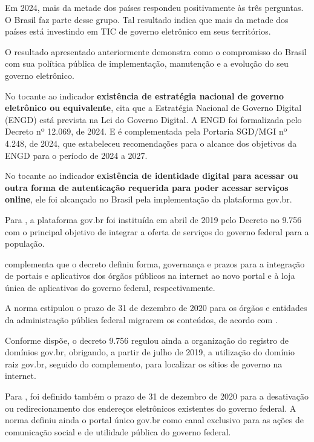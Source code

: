 Em 2024, mais da metade dos países respondeu positivamente às três perguntas. O Brasil faz parte desse grupo. Tal resultado indica que mais da metade dos países está investindo em TIC de governo eletrônico em seus territórios.

O resultado apresentado anteriormente demonstra como o compromisso do Brasil com sua política pública de implementação, manutenção e a evolução do seu governo eletrônico.

No tocante ao indicador \textbf{existência de estratégia nacional de governo
eletrônico ou equivalente}, \cite{brasil_engd} cita que a Estratégia Nacional de Governo Digital (ENGD) está prevista na Lei do Governo Digital. A ENGD foi formalizada pelo Decreto nº 12.069, de 2024. E é complementada pela Portaria SGD/MGI nº 4.248, de 2024, que estabeleceu recomendações para o alcance dos objetivos da ENGD para o período de 2024 a 2027.

No tocante ao indicador \textbf{existência de identidade digital para acessar
ou outra forma de autenticação requerida para poder acessar serviços online}, ele foi alcançado no Brasil pela implementação da plataforma gov.br. 

Para \cite{mitkiewicz2024transformaccao}, a plataforma gov.br foi instituída em abril de 2019 pelo Decreto no 9.756 com o principal objetivo de integrar a oferta de serviços do governo federal para a população. 

\cite{mitkiewicz2024transformaccao} complementa que o decreto definiu forma, governança e prazos para a integração de portais e aplicativos dos órgãos públicos na internet ao novo portal e à loja única de aplicativos do governo federal, respectivamente. 

A norma estipulou o prazo de 31 de dezembro de 2020 para os órgãos e entidades da administração pública federal migrarem os conteúdos, de acordo com \cite{mitkiewicz2024transformaccao}.

Conforme \cite{mitkiewicz2024transformaccao} dispõe, o decreto 9.756 regulou ainda a organização do registro de domínios gov.br, obrigando, a partir de julho de 2019, a utilização do domínio raiz gov.br, seguido do complemento, para localizar os sítios de governo na internet. 

Para \cite{mitkiewicz2024transformaccao}, foi definido também o prazo de 31 de dezembro de 2020 para a desativação ou redirecionamento dos endereços eletrônicos existentes do governo federal. A norma definiu ainda o portal único gov.br como canal exclusivo para as ações de comunicação social e de utilidade pública do governo federal.


